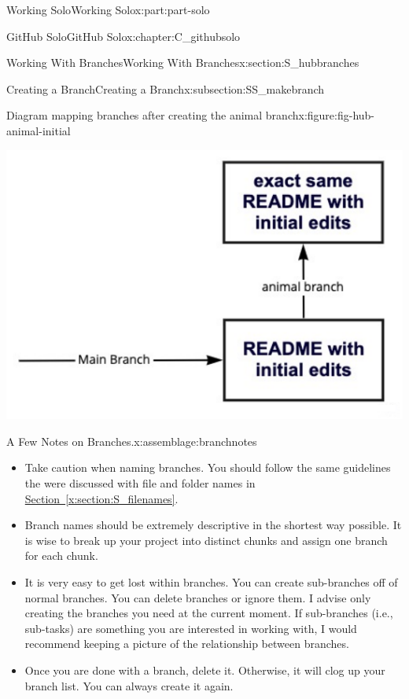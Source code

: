 \documentclass[oneside,10pt,]{book}
\newcommand{\xreffont}{\relax}
\begin{document}
\begin{partptx}{Working Solo}{}{Working Solo}{}{}{x:part:part-solo}
\begin{chapterptx}{GitHub Solo}{}{GitHub Solo}{}{}{x:chapter:C_githubsolo}
\begin{sectionptx}{Working With Branches}{}{Working With Branches}{}{}{x:section:S_hubbranches}
\begin{subsectionptx}{Creating a Branch}{}{Creating a Branch}{}{}{x:subsection:SS_makebranch}
\begin{figureptx}{Diagram mapping branches after creating the animal branch}{x:figure:fig-hub-animal-initial}{}%
\begin{image}{0.15}{0.7}{0.15}%
\includegraphics[width=\linewidth]{external/hub_animal_initial.pdf}
\end{image}%
\tcblower
\end{figureptx}%
\begin{assemblage}{A Few Notes on Branches.}{x:assemblage:branchnotes}%
%
\begin{itemize}[label=\textbullet]
\item{}Take caution when naming branches. You should follow the same guidelines the were discussed with file and folder names in \hyperref[x:section:S_filenames]{Section~{\xreffont\ref{x:section:S_filenames}}}.%
\item{}Branch names should be extremely descriptive in the shortest way possible. It is wise to break up your project into distinct chunks and assign one branch for each chunk.%
\item{}It is very easy to get lost within branches. You can create sub-branches off of normal branches. You can delete branches or ignore them. I advise only creating the branches you need at the current moment. If sub-branches (i.e., sub-tasks) are something you are interested in working with, I would recommend keeping a picture of the relationship between branches.%
\item{}Once you are done with a branch, delete it. Otherwise, it will clog up your branch list. You can always create it again.%
\end{itemize}
%
\end{assemblage}

\end{subsectionptx}
\end{sectionptx}
\end{chapterptx}
\end{partptx}
\end{document}

